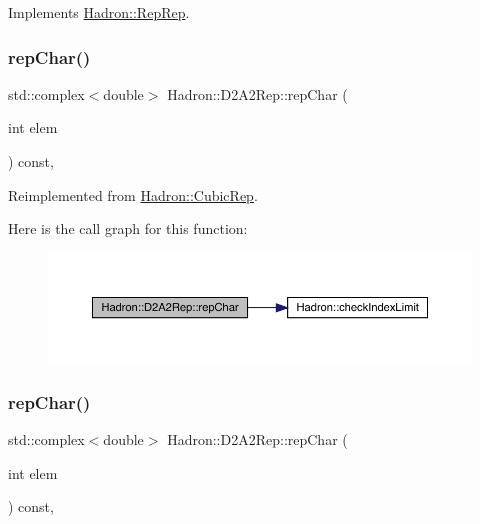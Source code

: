 Implements \mbox{\hyperlink{structHadron_1_1RepRep_ab3213025f6de249f7095892109575fde}{Hadron\+::\+Rep\+Rep}}.

\mbox{\label{structHadron_1_1D2A2Rep_a27712e402af9b022dee4cccf805ebe86}} 
\subsubsection{\texorpdfstring{repChar()}{repChar()}\hspace{0.1cm}{\footnotesize\ttfamily [1/3]}}
{\footnotesize\ttfamily std\+::complex$<$double$>$ Hadron\+::\+D2\+A2\+Rep\+::rep\+Char (\begin{DoxyParamCaption}\item[{int}]{elem }\end{DoxyParamCaption}) const\hspace{0.3cm}{\ttfamily [inline]}, {\ttfamily [virtual]}}



Reimplemented from \mbox{\hyperlink{structHadron_1_1CubicRep_af45227106e8e715e84b0af69cd3b36f8}{Hadron\+::\+Cubic\+Rep}}.

Here is the call graph for this function\+:
\nopagebreak
\begin{figure}[H]
\begin{center}
\leavevmode
\includegraphics[width=350pt]{d2/dfc/structHadron_1_1D2A2Rep_a27712e402af9b022dee4cccf805ebe86_cgraph}
\end{center}
\end{figure}
\mbox{\label{structHadron_1_1D2A2Rep_a27712e402af9b022dee4cccf805ebe86}} 
\subsubsection{\texorpdfstring{repChar()}{repChar()}\hspace{0.1cm}{\footnotesize\ttfamily [2/3]}}
{\footnotesize\ttfamily std\+::complex$<$double$>$ Hadron\+::\+D2\+A2\+Rep\+::rep\+Char (\begin{DoxyParamCaption}\item[{int}]{elem }\end{DoxyParamCaption}) const\hspace{0.3cm}{\ttfamily [inline]}, {\ttfamily [virtual]}}



